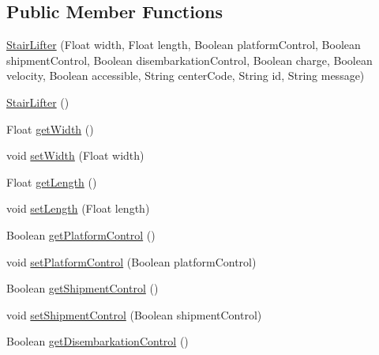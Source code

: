 \subsection*{Public Member Functions}
\begin{DoxyCompactItemize}
\item 
\mbox{\hyperlink{classcom_1_1osoc_1_1oncera_1_1javabean_1_1_stair_lifter_a689f1dd487807d797271e55566e91778}{Stair\+Lifter}} (Float width, Float length, Boolean platform\+Control, Boolean shipment\+Control, Boolean disembarkation\+Control, Boolean charge, Boolean velocity, Boolean accessible, String center\+Code, String id, String message)
\item 
\mbox{\hyperlink{classcom_1_1osoc_1_1oncera_1_1javabean_1_1_stair_lifter_a426e3ff49821574bf7907fbcd65bc95d}{Stair\+Lifter}} ()
\item 
Float \mbox{\hyperlink{classcom_1_1osoc_1_1oncera_1_1javabean_1_1_stair_lifter_aab1ec5b9d07716672cfecd8ee4fb531a}{get\+Width}} ()
\item 
void \mbox{\hyperlink{classcom_1_1osoc_1_1oncera_1_1javabean_1_1_stair_lifter_a0efd25873a516fee0af456a712684125}{set\+Width}} (Float width)
\item 
Float \mbox{\hyperlink{classcom_1_1osoc_1_1oncera_1_1javabean_1_1_stair_lifter_a4485160cb29b12dc7807902208e88a36}{get\+Length}} ()
\item 
void \mbox{\hyperlink{classcom_1_1osoc_1_1oncera_1_1javabean_1_1_stair_lifter_a51b07e5556024785f2209e93e5fc741b}{set\+Length}} (Float length)
\item 
Boolean \mbox{\hyperlink{classcom_1_1osoc_1_1oncera_1_1javabean_1_1_stair_lifter_a22768a37f28bc4dae5ca15ee901beb1f}{get\+Platform\+Control}} ()
\item 
void \mbox{\hyperlink{classcom_1_1osoc_1_1oncera_1_1javabean_1_1_stair_lifter_a6857c041e8c436b8a1742d9cb8f80ac1}{set\+Platform\+Control}} (Boolean platform\+Control)
\item 
Boolean \mbox{\hyperlink{classcom_1_1osoc_1_1oncera_1_1javabean_1_1_stair_lifter_a5acb22de1044d5eeeda444a88fd789e1}{get\+Shipment\+Control}} ()
\item 
void \mbox{\hyperlink{classcom_1_1osoc_1_1oncera_1_1javabean_1_1_stair_lifter_aecd723f371566c84e0e537df8c8db3bd}{set\+Shipment\+Control}} (Boolean shipment\+Control)
\item 
Boolean \mbox{\hyperlink{classcom_1_1osoc_1_1oncera_1_1javabean_1_1_stair_lifter_a194110ed7c437991c8c7d0edcaf4f33e}{get\+Disembarkation\+Control}} ()
\item 

\end{DoxyCompactItemize}
